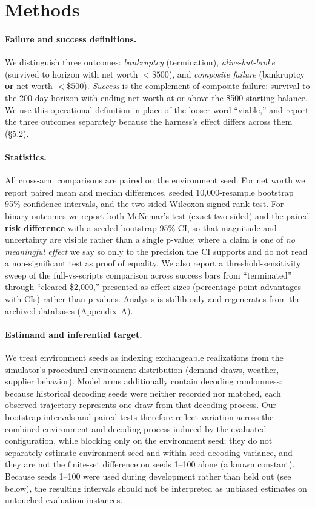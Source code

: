 \documentclass[11pt]{article}
\begin{document}
\section{Methods}

\paragraph{Failure and success definitions.} We distinguish three outcomes:
\emph{bankruptcy} (termination), \emph{alive-but-broke} (survived to horizon
with net worth $<\$500$), and \emph{composite failure} (bankruptcy \textbf{or}
net worth $<\$500$). \emph{Success} is the complement of composite failure:
survival to the 200-day horizon with ending net worth at or above the \$500
starting balance. We use this operational definition in place of the looser
word ``viable,'' and report the three outcomes separately because the harness's
effect differs across them (\S5.2).

\paragraph{Statistics.} All cross-arm comparisons are paired on the environment
seed. For net worth we report paired mean and median differences, seeded
10,000-resample bootstrap 95\% confidence intervals, and the two-sided Wilcoxon
signed-rank test. For binary outcomes we report both McNemar's test (exact
two-sided) and the paired \textbf{risk difference} with a seeded bootstrap 95\%
CI, so that magnitude and uncertainty are visible rather than a single
p-value; where a claim is one of \emph{no meaningful effect} we say so only to
the precision the CI supports and do not read a non-significant test as proof of
equality. We also report a threshold-sensitivity sweep of the full-vs-scripts
comparison across success bars from ``terminated'' through ``cleared \$2,000,''
presented as effect sizes (percentage-point advantages with CIs) rather than
p-values. Analysis is stdlib-only and regenerates from the archived databases
(Appendix~A).

\paragraph{Estimand and inferential target.} We treat environment seeds as
indexing exchangeable realizations from the simulator's procedural environment
distribution (demand draws, weather, supplier behavior). Model arms
additionally contain decoding randomness: because historical decoding seeds
were neither recorded nor matched, each observed trajectory represents one draw
from that decoding process. Our bootstrap intervals and paired tests therefore
reflect variation across the combined environment-and-decoding process induced
by the evaluated configuration, while blocking only on the environment seed;
they do not separately estimate environment-seed and within-seed decoding
variance, and they are not the finite-set difference on seeds 1--100 alone (a
known constant). Because seeds 1--100 were used during development rather than
held out (see below), the resulting intervals should not be interpreted as
unbiased estimates on untouched evaluation instances.
\end{document}
